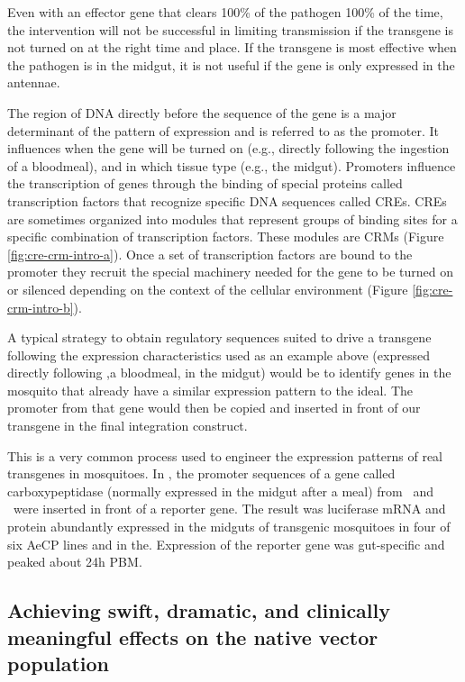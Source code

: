 Even with an effector gene that clears 100\% of the pathogen 100\% of the time, the intervention will not be successful in limiting transmission if the transgene is not turned on at the right time and place.
If the transgene is most effective when the pathogen is in the midgut, it is not useful if the gene is only expressed in the antennae.

The region of DNA directly before the sequence of the gene is a major determinant of the pattern of expression and is referred to as the promoter.
It influences when the gene will be turned on (e.g., directly following the ingestion of a bloodmeal), and in which tissue type (e.g., the midgut).
Promoters influence the transcription of genes through the binding of special proteins called transcription factors that recognize specific DNA sequences called \glspl{CRE}.
\glspl{CRE} are sometimes organized into modules that represent groups of binding sites for a specific combination of transcription factors.
These modules are \glspl{CRM} \CITEME (Figure \ref{fig:cre-crm-intro-a}).
Once a set of transcription factors are bound to the promoter they recruit the special machinery needed for the gene to be turned on or silenced depending on the context of the cellular environment (Figure \ref{fig:cre-crm-intro-b}).



A typical strategy to obtain regulatory sequences suited to drive a transgene following the expression characteristics used as an example above (expressed directly following ,a bloodmeal, in the midgut) would be to identify genes in the mosquito that already have a similar expression pattern to the ideal.
The promoter from that gene would then be copied and inserted in front of our transgene in the final integration construct.

This is a very common process used to engineer the expression patterns of real transgenes in mosquitoes.
In \cite{Moreira2000}, the promoter sequences of a gene called carboxypeptidase (normally expressed in the midgut after a meal) from \Aa\ and \Ag\ were inserted in front of a reporter gene.
The result was luciferase mRNA and protein abundantly expressed in the midguts of transgenic mosquitoes in four of six AeCP lines and in the.
Expression of the reporter gene was gut-specific and peaked about 24h \gls{PBM}.


\subsection{Achieving swift, dramatic, and clinically meaningful effects on the native vector population}

